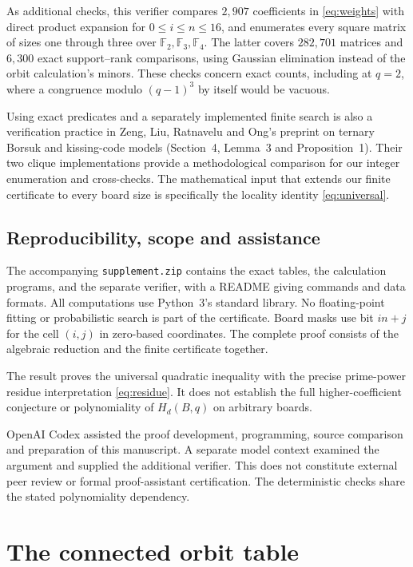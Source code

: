 \documentclass[11pt]{article}
\newcommand{\FF}{\mathbb F}
\begin{document}
As additional checks, this verifier compares $2{,}907$ coefficients in
\eqref{eq:weights} with direct product expansion for
$0\leq i\leq n\leq16$, and enumerates every square matrix of sizes
one through three over $\FF_2,\FF_3,\FF_4$. The latter covers
$282{,}701$ matrices and $6{,}300$ exact support--rank comparisons,
using Gaussian elimination instead of the orbit calculation's minors.
These checks concern exact counts, including at $q=2$, where a
congruence modulo $(q-1)^3$ by itself would be vacuous.

Using exact predicates and a separately implemented finite search is
also a verification practice in Zeng, Liu, Ratnavelu and Ong's preprint
on ternary Borsuk and kissing-code models
\cite{ZengEtAl2026Certificates} (Section~4, Lemma~3 and Proposition~1).
Their two clique implementations provide a methodological comparison
for our integer enumeration and cross-checks. The mathematical input
that extends our finite certificate to every board size is specifically
the locality identity \eqref{eq:universal}.

\subsection*{Reproducibility, scope and assistance}

The accompanying \texttt{supplement.zip} contains the exact tables,
the calculation programs, and the separate verifier, with a README
giving commands and data formats. All computations use Python~3's
standard library. No floating-point fitting or probabilistic search
is part of the certificate. Board masks use bit $in+j$ for the cell
$(i,j)$ in zero-based coordinates. The complete proof consists of the
algebraic reduction and the finite certificate together.

The result proves the universal quadratic inequality with the precise
prime-power residue interpretation \eqref{eq:residue}. It does not
establish the full higher-coefficient conjecture or polynomiality of
$H_d(B,q)$ on arbitrary boards.

OpenAI Codex assisted the proof development, programming, source
comparison and preparation of this manuscript. A separate model
context examined the argument and supplied the additional verifier.
This does not constitute external peer review or formal proof-assistant
certification. The deterministic checks share the stated polynomiality
dependency.

\clearpage
\appendix
\section{The connected orbit table}\label{app:orbits}
\end{document}
